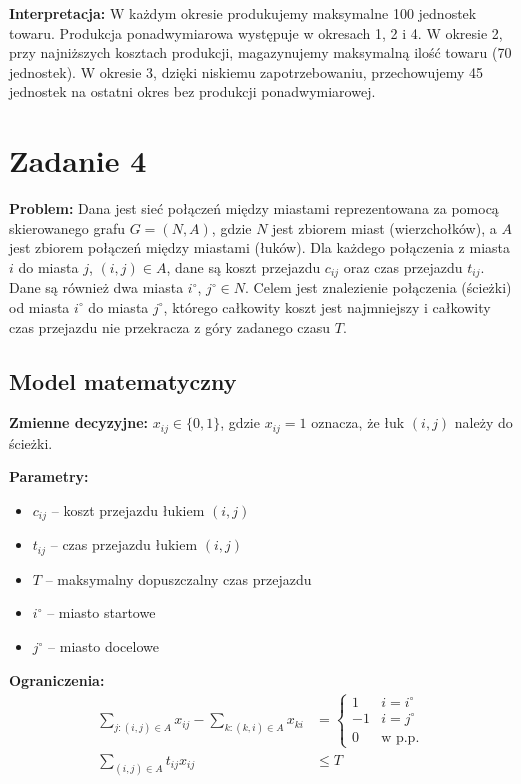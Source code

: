 \documentclass[a4paper,12pt]{article}
\begin{document}
\textbf{Interpretacja:} W każdym okresie produkujemy maksymalne 100 jednostek towaru. Produkcja ponadwymiarowa występuje w okresach 1, 2 i 4. W okresie 2, przy najniższych kosztach produkcji, magazynujemy maksymalną ilość towaru (70 jednostek). W okresie 3, dzięki niskiemu zapotrzebowaniu, przechowujemy 45 jednostek na ostatni okres bez produkcji ponadwymiarowej.

\section*{Zadanie 4}

\textbf{Problem:} Dana jest sieć połączeń między miastami reprezentowana za pomocą skierowanego grafu $G = (N, A)$, gdzie $N$ jest zbiorem miast (wierzchołków), a $A$ jest zbiorem połączeń między miastami (łuków). Dla każdego połączenia z miasta $i$ do miasta $j$, $(i, j) \in A$, dane są koszt przejazdu $c_{ij}$ oraz czas przejazdu $t_{ij}$. Dane są również dwa miasta $i^\circ$, $j^\circ \in N$. Celem jest znalezienie połączenia (ścieżki) od miasta $i^\circ$ do miasta $j^\circ$, którego całkowity koszt jest najmniejszy i całkowity czas przejazdu nie przekracza z góry zadanego czasu $T$.

\subsection*{Model matematyczny}

\textbf{Zmienne decyzyjne:} $x_{ij} \in \{0,1\}$, gdzie $x_{ij} = 1$ oznacza, że łuk $(i,j)$ należy do ścieżki.

\textbf{Parametry:}
\begin{itemize}
\item $c_{ij}$ -- koszt przejazdu łukiem $(i,j)$
\item $t_{ij}$ -- czas przejazdu łukiem $(i,j)$
\item $T$ -- maksymalny dopuszczalny czas przejazdu
\item $i^\circ$ -- miasto startowe
\item $j^\circ$ -- miasto docelowe
\end{itemize}

\textbf{Ograniczenia:}
\begin{align*}
\sum_{j:(i,j)\in A} x_{ij} - \sum_{k:(k,i)\in A} x_{ki} &=
\begin{cases}
1 & i = i^\circ \\
-1 & i = j^\circ \\
0 & \text{w p.p.}
\end{cases} \\
\sum_{(i,j)\in A} t_{ij} x_{ij} &\leq T
\end{align*}
\end{document}
